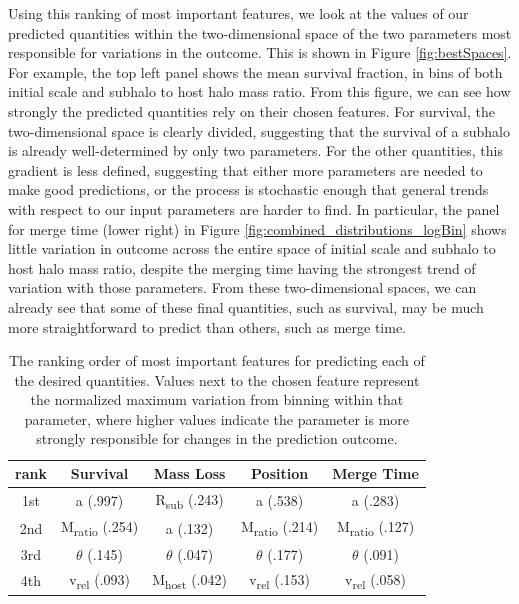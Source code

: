 \documentclass[fleqn,usenatbib]{mnras}
\begin{document}
Using this ranking of most important features, we look at the values of our predicted quantities within the two-dimensional space of the two parameters most responsible for variations in the outcome. This is shown in Figure \ref{fig:bestSpaces}. For example, the top left panel shows the mean survival fraction, in bins of both initial scale and subhalo to host halo mass ratio. From this figure, we can see how strongly the predicted quantities rely on their chosen features. For survival, the two-dimensional space is clearly divided, suggesting that the survival of a subhalo is already well-determined by only two parameters. For the other quantities, this gradient is less defined, suggesting that either more parameters are needed to make good predictions, or the process is stochastic enough that general trends with respect to our input parameters are harder to find. In particular, the panel for merge time (lower right) in Figure \ref{fig:combined_distributions_logBin} shows little variation in outcome across the entire space of initial scale and subhalo to host halo mass ratio, despite the merging time having the strongest trend of variation with those parameters. From these two-dimensional spaces, we can already see that some of these final quantities, such as survival, may be much more straightforward to predict than others, such as merge time.

\begin{table}
	\centering
	\caption{The ranking order of most important features for predicting each of the desired quantities. Values next to the chosen feature represent the normalized maximum variation from binning within that parameter, where higher values indicate the parameter is more strongly responsible for changes in the prediction outcome.}
	\label{tab:FS_table}
	\begin{tabular}{c|cccc} %
		\hline
		rank & Survival & Mass Loss & Position & Merge Time\\
		\hline
		1st & a (.997) & R\textsubscript{sub} (.243) & a (.538) & a (.283)\\
		2nd & M\textsubscript{ratio} (.254) & a (.132) & M\textsubscript{ratio} (.214) & M\textsubscript{ratio} (.127)\\
		3rd & $\theta$ (.145) & $\theta$ (.047) &  $\theta$ (.177) & $\theta$ (.091)\\
		4th & v\textsubscript{rel} (.093) & M\textsubscript{host} (.042) & v\textsubscript{rel} (.153) & v\textsubscript{rel} (.058)\\
		\hline
	\end{tabular}
\end{table}
\end{document}

